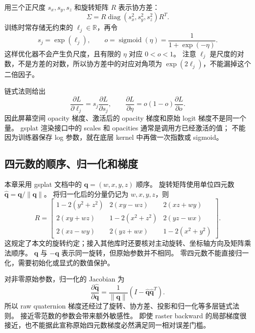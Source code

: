 用三个正尺度 $s_x,s_y,s_z$ 和旋转矩阵 $R$ 表示协方差：
\begin{equation}
 \Sigma=R\operatorname{diag}(s_x^2,s_y^2,s_z^2)R^T.
\end{equation}
训练时常存储无约束的 $\ell_j\in\mathbb R$，再令
\begin{equation}
 s_j=\exp(\ell_j),\qquad
 o=\operatorname{sigmoid}(\eta)=\frac{1}{1+\exp(-\eta)}.
\end{equation}
这样优化器不会产生负尺度，且有限的 $\eta$ 对应 $0<o<1$。
注意 $\ell_j$ 是尺度的对数，不是方差的对数，所以协方差中的对应对角项为
$\exp(2\ell_j)$，不能漏掉这个二倍因子。

链式法则给出
\begin{equation}
 \frac{\partial L}{\partial\ell_j}
 =s_j\frac{\partial L}{\partial s_j},\qquad
 \frac{\partial L}{\partial\eta}
 =o(1-o)\frac{\partial L}{\partial o}.
\end{equation}
因此屏幕空间 opacity 梯度、激活后的 opacity 梯度和原始 logit 梯度不是同一个量。
gsplat 渲染接口中的 scales 和 opacities 通常是调用方已经激活的值；
不能因为训练器保存 log 参数，就在底层 kernel 中再做一次指数或 sigmoid。

\subsection{四元数的顺序、归一化和梯度}

本章采用 gsplat 文档中的 $\mathbf q=(w,x,y,z)$ 顺序。
旋转矩阵使用单位四元数 $\widehat{\mathbf q}=\mathbf q/\|\mathbf q\|$。
将归一化后的分量仍记为 $w,x,y,z$，则
\begin{equation}
 R=\begin{bmatrix}
 1-2(y^2+z^2)&2(xy-wz)&2(xz+wy)\\
 2(xy+wz)&1-2(x^2+z^2)&2(yz-wx)\\
 2(xz-wy)&2(yz+wx)&1-2(x^2+y^2)
 \end{bmatrix}.
\end{equation}
这规定了本文的旋转约定；接入其他库时还要核对主动旋转、坐标轴方向及矩阵乘法顺序。
$\mathbf q$ 与 $-\mathbf q$ 表示同一旋转，但原始参数并不相同。
零四元数不能直接归一化，需要初始化或显式的数值保护。

对非零原始参数，归一化的 Jacobian 为
\begin{equation}
 \frac{\partial\widehat{\mathbf q}}{\partial\mathbf q}
 =\frac{1}{\|\mathbf q\|}
 \left(I-\widehat{\mathbf q}\widehat{\mathbf q}^{T}\right).
\end{equation}
所以 raw quaternion 梯度还经过了旋转、协方差、投影和归一化等多层链式法则。
接近零范数的参数会带来额外敏感性。
即使 raster backward 的局部梯度很接近，也不能据此宣称原始四元数梯度必然满足同一相对误差门槛。

